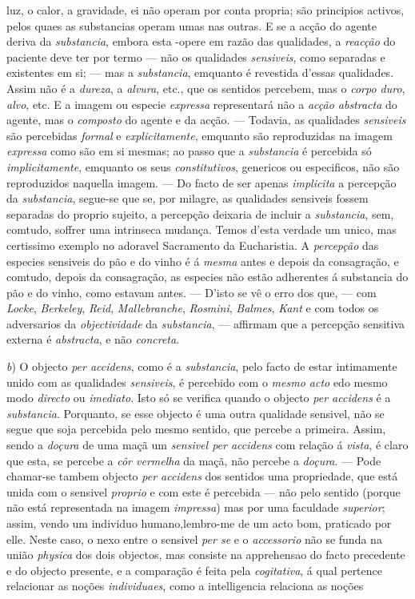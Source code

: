 luz, o calor, a gravidade, ei não operam por conta propria; são principios activos, pelos quaes as substancias operam umas nas outras. E se a acção do agente deriva da \emph{substancia}, embora esta -opere em razão das qualidades, a \emph{reacção} do paciente deve ter por termo --- não os qualidades \emph{sensiveis}, como separadas e existentes em si; --- mas a \emph{substancia}, emquanto é revestida d'essas qualidades. Assim não é a \emph{dureza}, a \emph{alvura}, etc., que os sentidos percebem, mas o \emph{corpo duro}, \emph{alvo}, etc. E a imagem ou especie \emph{expressa} representará não a \emph{acção abstracta} do agente, mas o \emph{composto} do agente e da acção. --- Todavia, as qualidades \emph{sensiveis} são percebidas \emph{formal} e \emph{explicitamente}, emquanto são reproduzidas na imagem \emph{expressa} como são em si mesmas; ao passo que a \emph{substancia} é percebida só \emph{implicitamente}, emquanto os seus \emph{constitutivos}, genericos ou especificos, não são reproduzidos naquella imagem. --- Do facto de ser apenas \emph{implicita} a percepção da \emph{substancia}, segue-se que se, por milagre, as qualidades sensiveis fossem separadas do proprio sujeito, a percepção deixaria de incluir a \emph{substancia}, sem, comtudo, soffrer uma intrinseca mudança. Temos d'esta verdade um unico, mas certissimo exemplo no adoravel Sacramento da Eucharistia. A \emph{percepção} das especies sensiveis do pão e do vinho é á \emph{mesma} antes e depois da consagração, e comtudo, depois da consagração, as especies não estão adherentes á substancia do pão e do vinho, como estavam antes. --- D'isto se vê o erro dos que, --- com \emph{Locke}, \emph{Berkeley}, \emph{Reid}, \emph{Mallebranche}, \emph{Rosmini}, \emph{Balmes}, \emph{Kant} e com todos os adversarios da \emph{objectividade} da \emph{substancia}, --- affirmam que a percepção sensitiva externa é \emph{abstracta}, e não \emph{concreta}.\par \emph{b}) O objecto \emph{per accidens}, como é a \emph{substancia}, pelo facto de estar intimamente unido com as qualidades \emph{sensiveis}, é percebido com o \emph{mesmo acto} edo mesmo modo \emph{directo} ou \emph{imediato}. Isto só se verifica quando o objecto \emph{per accidens} é a \emph{substancia}. Porquanto, se esse objecto é uma outra qualidade sensivel, não se segue que soja percebida pelo mesmo sentido, que percebe a primeira. Assim, sendo a \emph{doçura} de uma maçã um \emph{sensivel per accidens} com relação á \emph{vista}, é claro que esta, se percebe a \emph{côr vermelha} da maçã, não percebe a \emph{doçura}. --- Pode chamar-se tambem objecto \emph{per accidens} dos sentidos uma propriedade, que está unida com o sensivel \emph{proprio} e com este é percebida --- não pelo sentido (porque não está representada na imagem \emph{impressa}) mas por uma faculdade \emph{superior}; assim, vendo um individuo humano,lembro-me de um acto bom, praticado por elle. Neste caso, o nexo entre o sensivel \emph{per se} e o \emph{accessorio} não se funda na união \emph{physica} dos dois objectos, mas consiste na apprehensao do facto precedente e do objecto presente, e a comparação é feita pela \emph{cogitativa}, á qual pertence relacionar as noções \emph{individuaes}, como a intelligencia relaciona as noções 